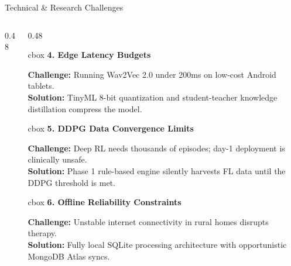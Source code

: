 \documentclass[aspectratio=169, 11pt, xcolor=table]{beamer}
\begin{document}
\begin{frame}{Technical \& Research Challenges}
\begin{columns}[T]
\begin{column}{0.48\textwidth}
        \end{column}

        \begin{column}{0.48\textwidth}
            
            \begin{beamercolorbox}[wd=\linewidth, sep=3pt, rounded=true]{cbox}
                \textbf{\textcolor{amritaMaroon}{\footnotesize 4. Edge Latency Budgets}} \\[1mm]
                {\scriptsize \textbf{Challenge:} Running Wav2Vec 2.0 under 200ms on low-cost Android tablets.\\
                \textbf{Solution:} TinyML 8-bit quantization and student-teacher knowledge distillation compress the model.\par}
            \end{beamercolorbox}
            \vspace{2mm}
            
            \begin{beamercolorbox}[wd=\linewidth, sep=3pt, rounded=true]{cbox}
                \textbf{\textcolor{amritaMaroon}{\footnotesize 5. DDPG Data Convergence Limits}} \\[1mm]
                {\scriptsize \textbf{Challenge:} Deep RL needs thousands of episodes; day-1 deployment is clinically unsafe.\\
                \textbf{Solution:} Phase 1 rule-based engine silently harvests FL data until the DDPG threshold is met.\par}
            \end{beamercolorbox}
            \vspace{2mm}
            
            \begin{beamercolorbox}[wd=\linewidth, sep=3pt, rounded=true]{cbox}
                \textbf{\textcolor{amritaMaroon}{\footnotesize 6. Offline Reliability Constraints}} \\[1mm]
                {\scriptsize \textbf{Challenge:} Unstable internet connectivity in rural homes disrupts therapy.\\
                \textbf{Solution:} Fully local SQLite processing architecture with opportunistic MongoDB Atlas syncs.\par}
            \end{beamercolorbox}
            
        \end{column}
    \end{columns}
\end{frame}%
\end{document}
